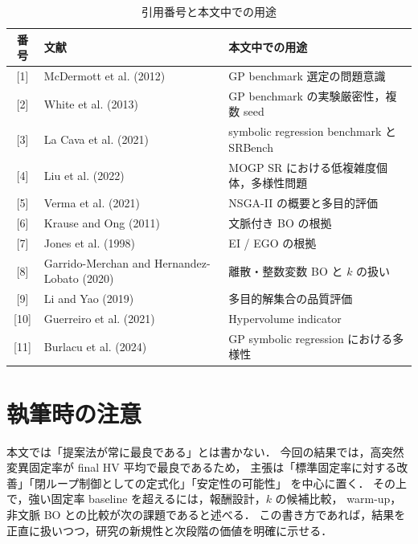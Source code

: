 \documentclass[a4paper,10pt,twocolumn]{ltjsarticle}
\newcommand{\HV}{\mathrm{HV}}
\begin{document}
\begin{table}[tb]
\centering
\caption{引用番号と本文中での用途}
\label{tab:citation-map}
\begin{tabular}{cll}
\toprule
番号 & 文献 & 本文中での用途 \\
\midrule
{[1]} & McDermott et al. (2012) & GP benchmark 選定の問題意識 \\
{[2]} & White et al. (2013) & GP benchmark の実験厳密性，複数 seed \\
{[3]} & La Cava et al. (2021) & symbolic regression benchmark と SRBench \\
{[4]} & Liu et al. (2022) & MOGP SR における低複雑度個体，多様性問題 \\
{[5]} & Verma et al. (2021) & NSGA-II の概要と多目的評価 \\
{[6]} & Krause and Ong (2011) & 文脈付き BO の根拠 \\
{[7]} & Jones et al. (1998) & EI / EGO の根拠 \\
{[8]} & Garrido-Merchan and Hernandez-Lobato (2020) & 離散・整数変数 BO と \(k\) の扱い \\
{[9]} & Li and Yao (2019) & 多目的解集合の品質評価 \\
{[10]} & Guerreiro et al. (2021) & Hypervolume indicator \\
{[11]} & Burlacu et al. (2024) & GP symbolic regression における多様性 \\
\bottomrule
\end{tabular}
\end{table}

\section{執筆時の注意}

本文では「提案法が常に最良である」とは書かない．
今回の結果では，高突然変異固定率が final \(\HV\) 平均で最良であるため，
主張は「標準固定率に対する改善」「閉ループ制御としての定式化」「安定性の可能性」
を中心に置く．
その上で，強い固定率 baseline を超えるには，報酬設計，\(k\) の候補比較，
warm-up，非文脈 BO との比較が次の課題であると述べる．
この書き方であれば，結果を正直に扱いつつ，研究の新規性と次段階の価値を明確に示せる．
\end{document}
